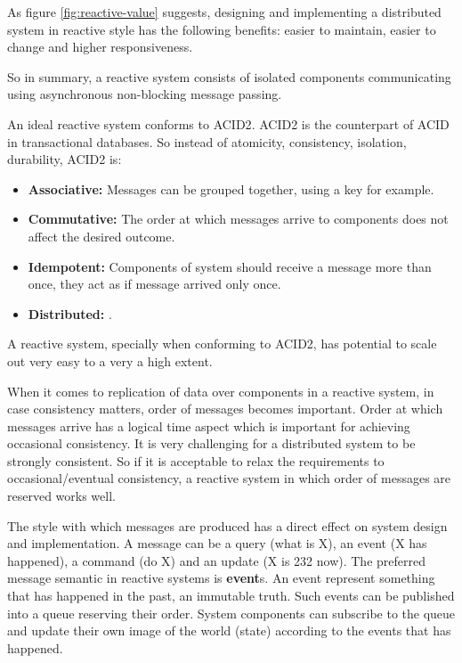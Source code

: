 \documentclass[a4]{report}
\begin{document}
    As figure \ref{fig:reactive-value} suggests, designing and implementing a distributed system in reactive style
    has the following benefits: easier to maintain, easier to change and higher responsiveness.

    So in summary, a reactive system consists of isolated components communicating using asynchronous non-blocking message passing.

    An ideal reactive system conforms to ACID2\cite{reactive-microsystems}.
    ACID2 is the counterpart of ACID in transactional databases.
    So instead of atomicity, consistency, isolation, durability, ACID2 is:
    \begin{itemize}
        \item \textbf{Associative:} Messages can be grouped together, using a key for example.
        \item \textbf{Commutative:} The order at which messages arrive to components does not affect the desired
        outcome.
        \item \textbf{Idempotent:} Components of system should receive a message more than once, they act as if message arrived only once.
        \item \textbf{Distributed:} .
    \end{itemize}

    A reactive system, specially when conforming to ACID2, has potential to scale out very easy to a very a high extent.

    When it comes to replication of data over components in a reactive system, in case consistency matters, order of
    messages becomes important.
    Order at which messages arrive has a logical time aspect which is important for achieving occasional consistency.
    It is very challenging for a distributed system to be strongly consistent.
    So if it is acceptable to relax the requirements to occasional/eventual consistency, a reactive system in which
    order of messages are reserved works well.

    The style with which messages are produced has a direct effect on system design and implementation.
    A message can be a query (what is X), an event (X has happened), a command (do X) and an update (X is 232 now).
    The preferred message semantic in reactive systems is \textbf{event}s.
    An event represent something that has happened in the past, an immutable truth.
    Such events can be published into a queue reserving their order.
    System components can subscribe to the queue and update their own image of the world (state) according to the
    events that has happened.
\end{document}
